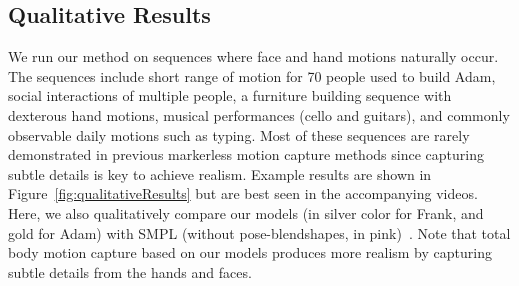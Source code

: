 

\subsection{Qualitative Results}
We run our method on sequences where face and hand motions naturally occur. The sequences include short range of motion for 70 people used to build Adam, social interactions of multiple people, a furniture building sequence with dexterous hand motions, musical performances (cello and guitars), and commonly observable daily motions such as typing. Most of these sequences are rarely demonstrated in previous markerless motion capture methods since capturing subtle details is key to achieve realism.  Example results are shown in Figure~\ref{fig:qualitativeResults} but are best seen in the accompanying videos. Here, we also qualitatively compare our models (in silver color for Frank, and gold for Adam) with SMPL (without pose-blendshapes, in pink)~\cite{Loper2015}. Note that total body motion capture based on our models produces more realism by capturing subtle details from the hands and faces.


